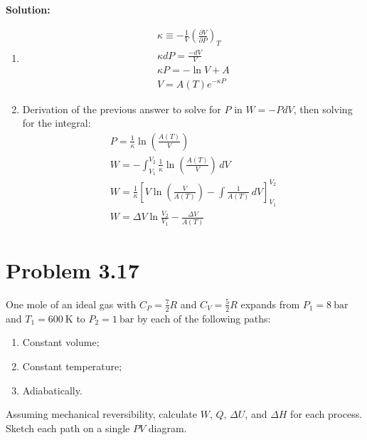 \documentclass{article}
\newenvironment{solution}{\par\noindent\textbf{\\Solution:\\}}{\par\medskip}
\begin{document}
\begin{solution}
  \begin{enumerate}[label=(\alph*)]
    \item
      \begin{gather*}
        \kappa \equiv -\frac{1}{V}\left( \frac{\partial V}{\partial P}
        \right)_{T} \\
        \kappa dP = \frac{-dV}{V} \\
        \kappa P = -\ln V + A \\
        \boxed{ V = A\left( T \right)e^{-\kappa P} }
      \end{gather*}
    \item Derivation of the previous answer to solve for $P$ in
      $W=-PdV$, then solving for the integral:
      \begin{gather*}
        P = \frac{1}{\kappa }\ln\left( \frac{A\left( T
        \right)}{V} \right) \\
        W = -\int_{V_{1}}^{V_{2}} \frac{1}{\kappa }\ln\left(
        \frac{A\left( T \right)}{V} \right) \, dV \\
        W = \frac{1}{\kappa }\left[ V\ln\left( \frac{V}{A\left( T
          \right)} \right)-\int \frac{1}{A\left( T \right)} \, dV
        \right]_{V_{1}}^{V_{2}}\\
        \boxed{ W = \Delta V \ln \frac{V_{2}}{V_{1}} - \frac{\Delta
        V}{A\left( T \right)} }
      \end{gather*}
  \end{enumerate}
\end{solution}

\section*{Problem 3.17}
One mole of an ideal gas with $C_P = \frac{7}{2}R$ and $C_V =
\frac{5}{2}R$ expands from $P_1 = \SI{8}{\bar}$ and $T_1 =
\SI{600}{\kelvin}$ to $P_2 = \SI{1}{\bar}$ by each of the following paths:
\begin{enumerate}[label=(\alph*)]
  \item Constant volume;
  \item Constant temperature;
  \item Adiabatically.
\end{enumerate}
Assuming mechanical reversibility, calculate $W$, $Q$, $\Delta U$,
and $\Delta H$ for each process. Sketch each path on a single $PV$ diagram.
\end{document}
